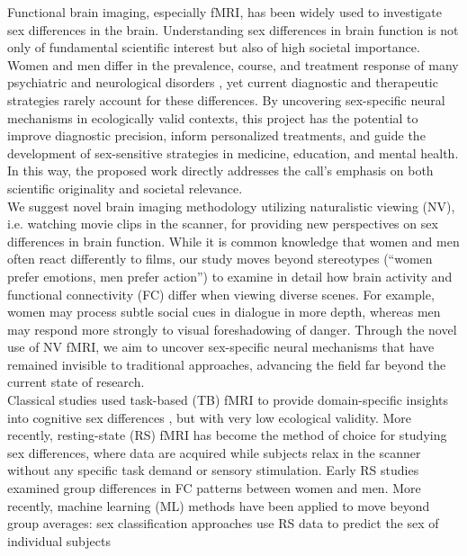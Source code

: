 \documentclass[11pt,a4paper]{article}
\begin{document}
Functional brain imaging, especially fMRI, has been widely used to investigate sex differences in the brain. 
Understanding sex differences in brain function is not only of fundamental scientific interest but also of high societal importance. 
Women and men differ in the prevalence, course, and treatment response of many psychiatric and neurological disorders \parencite{cahillWhySexMatters2006,gobinathSexHormonesGenotype2017}, 
yet current diagnostic and therapeutic strategies rarely account for these differences. By uncovering sex-specific neural mechanisms 
in ecologically valid contexts, this project has the potential to improve diagnostic precision, inform personalized treatments, 
and guide the development of sex-sensitive strategies in medicine, education, and mental health. 
In this way, the proposed work directly addresses the call's emphasis on both scientific originality and societal relevance.\\
We suggest novel brain imaging methodology utilizing naturalistic viewing (NV), i.e. watching movie 
clips in the scanner, for providing new perspectives on sex differences in brain function. While it is common knowledge 
that women and men often react differently to films, our study moves beyond stereotypes (“women prefer emotions, 
men prefer action”) to examine in detail how brain activity and functional connectivity (FC) differ when 
viewing diverse scenes. For example, women may process subtle social cues in dialogue in more depth, whereas 
men may respond more strongly to visual foreshadowing of danger. Through the novel use of NV fMRI, we aim to uncover 
sex-specific neural mechanisms that have remained invisible to traditional approaches, advancing the field far beyond 
the current state of research.\\
Classical studies used task-based (TB) fMRI to provide domain-specific insights into cognitive sex differences 
\parencite{thimmMenstrualCycleEffects2014a,weisDynamicChangesFunctional2011,weisEstradiolModulatesFunctional2008}, 
but with very low ecological validity. More recently, resting-state (RS) fMRI has become the method of choice
for studying sex differences, where data are acquired while subjects relax in the scanner without any specific task 
demand or sensory stimulation. Early RS studies examined group differences in FC patterns between women and men. 
More recently, machine learning (ML) methods have been applied to move beyond group averages: 
sex classification approaches use RS data to predict the sex of individual subjects 
\end{document}
